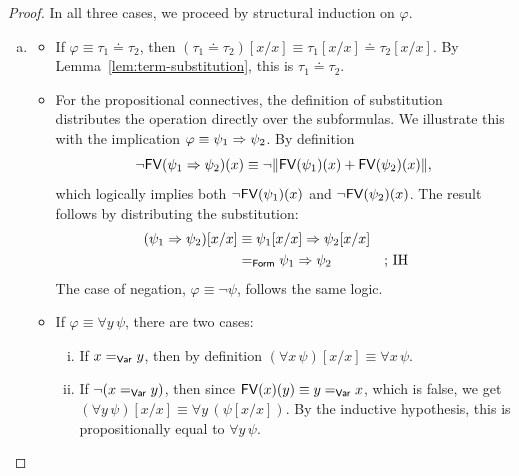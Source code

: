 \begin{proof} 
    In all three cases, we proceed by structural induction on $\varphi$. 
    \begin{enumerate}[a),font=\upshape]
        \item 
        \begin{itemize}
            \item If $\varphi\equiv\tau_1\doteq\tau_2$, then $(\tau_1\doteq \tau_2)[x/x]\equiv \tau_1[x/x]\doteq \tau_2[x/x]$. By Lemma~\ref{lem:term-substitution}, this is $\tau_1\doteq\tau_2$.
            
            \item For the propositional connectives, the definition of substitution distributes the operation directly over the subformulas. We illustrate this with the implication $\varphi \equiv\psi_1\mathrel{\Rightarrow}\psi_2$. By definition
            \[
                \neg\mathsf{FV}(\psi_1\mathrel{\Rightarrow}\psi_2)(x)
                \equiv
                \neg\lVert
                    \mathsf{FV}(\psi_1)(x)
                    +
                    \mathsf{FV}(\psi_2)(x)
                \rVert,
            \]
            which logically implies both $\neg\mathsf{FV}(\psi_1)(x)$ and $\neg\mathsf{FV}(\psi_2)(x)$. The result follows by distributing the substitution:
            \begin{align*}
                (\psi_1\mathrel{\Rightarrow} \psi_2)[x/x] 
                    &\equiv \psi_1[x/x]\mathrel{\Rightarrow}\psi_2[x/x] \\
                    &\mathrel{=_{\mathsf{Form}}}\psi_1\mathrel{\Rightarrow}\psi_2 
                        &&\text{; IH}
            \end{align*}
            The case of negation, $\varphi\equiv\neg\psi$, follows the same logic.
            
            \item If $\varphi\equiv\forall y\,\psi$, there are two cases:
            \begin{enumerate}[i)]
                \item If $x\mathrel{=_{\mathsf{Var}}}y$, then by definition $(\forall x\,\psi)[x/x]\equiv\forall x\,\psi$.
                
                \item If $\neg(x\mathrel{=_{\mathsf{Var}}}y)$, then since $\mathsf{FV}(x)(y)\equiv y\mathrel{=_{\mathsf{Var}}}x$, which is false, we get $(\forall y\,\psi)[x/x]\equiv\forall y\,(\psi[x/x])$. By the inductive hypothesis, this is propositionally equal to $\forall y\,\psi$.
            \end{enumerate}
        \end{itemize}
        

\end{enumerate}
\end{proof}
